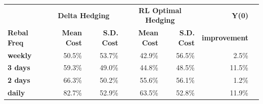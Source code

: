 \documentclass{article}
\begin{document}
\begin{table}[htbp]
\centering
\vspace{0.4em}
\begin{tabular}{lrrrrrr}
\hline
 & \multicolumn{2}{c}{\textbf{Delta Hedging}} & \multicolumn{2}{c}{\textbf{RL Optimal Hedging}} & \textbf{Y(0)} \\
\textbf{Rebal Freq} & \textbf{Mean Cost} & \textbf{S.D. Cost} & \textbf{Mean Cost} & \textbf{S.D. Cost} & \textbf{improvement} \\
\hline
\textbf{weekly} & 50.5\% & 53.7\% & 42.9\% & 56.5\% & 2.5\% \\
\textbf{3 days} & 59.3\% & 49.0\% & 44.8\% & 48.5\% & 11.5\% \\
\textbf{2 days} & 66.3\% & 50.2\% & 55.6\% & 56.1\% & 1.2\% \\
\textbf{daily} & 82.7\% & 52.9\% & 63.5\% & 52.8\% & 11.9\% \\
\hline
\end{tabular}
\end{table}
\end{document}
